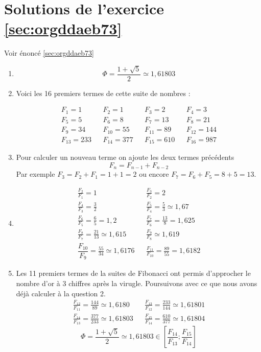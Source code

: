 \documentclass[a4paper, 11pt, twoside]{book}
\begin{document}
\section{Solutions de l'exercice \ref{sec:orgddaeb73}}
\label{sec:org5140565}
Voir énoncé \ref{sec:orgddaeb73}

\begin{enumerate}
\item \[\Phi = \dfrac{1 + \sqrt{5}}{2} \simeq 1,61803\]
\item Voici les 16 premiers termes de cette suite de nombres :

\begin{align*}
F_1 = 1&& F_2 = 1&& F_3 = 2&& F_4 = 3\\
F_5 = 5&& F_6 = 8&& F_7 = 13&& F_8 = 21\\
F_9 = 34&& F_{10} = 55&& F_{11} = 89&& F_{12} = 144\\
F_{13} = 233&& F_{14} = 377&& F_{15} = 610&& F_{16} = 987
\end{align*}

\item Pour calculer un nouveau terme on ajoute les deux termes
précédents \[F_n = F_{n - 1} + F_{n-2}\]
Par exemple \(F_3 = F_2 + F_1 = 1 + 1 = 2\) ou encore \(F_7 =
       F_6 + F_5 = 8 + 5 = 13\).
\item \begin{align*}
\frac{F_2}{F_1} = 1&& \frac{F_3}{F_2} = 2\\
\frac{F_4}{F_3} = \frac{3}{2}&& \frac{F_5}{F_4} =
\frac{5}{3}\simeq 1,67\\
\frac{F_6}{F_5} = \frac{6}{5} = 1,2&&\frac{F_7}{F_6} =
\frac{13}{8} = 1,625\\
\frac{F_8}{F_7} = \frac{21}{13}\simeq
1,615&&\frac{F_9}{F_8}\simeq 1,619\\
\dfrac{F_{10}}{F_9} = \frac{55}{34}\simeq 1,6176&&
\frac{F_{11}}{F_{10}} = \frac{89}{55} = 1,6182
\end{align*}
\item Les 11 premiers termes de la suites de Fibonacci ont permis
d'approcher le nombre d'or à 3 chiffres après la
virugle. Poursuivons avec ce que nous avons déjà calculer à la
question 2.
\begin{align*}
\frac{F_{12}}{F_{11}} = \frac{144}{89}\simeq 1,6180&&\frac{F_{13}}{F_{12}} = \frac{233}{144}\simeq 1,61801\\
\frac{F_{14}}{F_{13}} = \frac{377}{233}\simeq 1,61803&&\frac{F_{15}}{F_{14}} = \frac{610}{377}\simeq 1,61804
\end{align*}
\[\Phi = \dfrac{1 + \sqrt{5}}{2} \simeq 1,61803\in
       \left[\dfrac{F_{14}}{F_{13}} ; \dfrac{F_{15}}{F_{14}}\right]\]
\end{enumerate}
\end{document}
